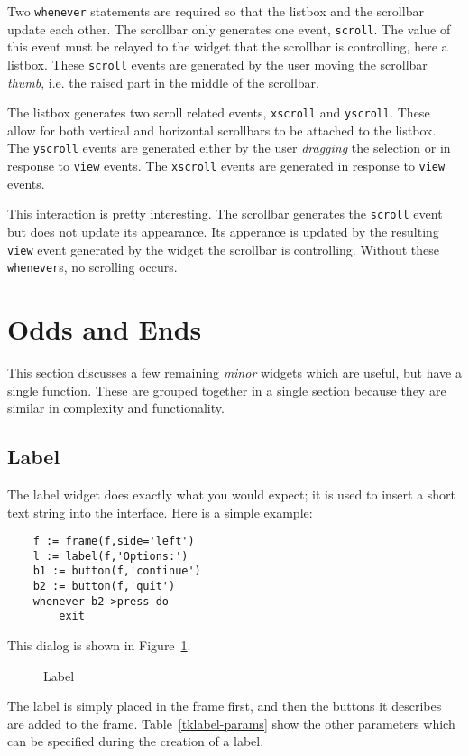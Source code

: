 Two {\tt whenever} statements are required so that the listbox and the scrollbar
update each other. The scrollbar only generates one event, {\tt scroll}. The value
of this event must be relayed to the widget that the scrollbar is controlling, here
a listbox. These {\tt scroll} events are generated by the user moving the scrollbar
{\em thumb}, i.e. the raised part in the middle of the scrollbar.

The listbox generates two scroll related events, {\tt xscroll} and {\tt yscroll}.
These allow for both vertical and horizontal scrollbars to be attached to the listbox.
The {\tt yscroll} events are generated either by the user {\em dragging} the selection
or in response to {\tt view} events. The {\tt xscroll} events are generated in response
to {\tt view} events.

This interaction is pretty interesting. The scrollbar generates the {\tt scroll} event
but does not update its appearance. Its apperance is updated by the resulting {\tt view}
event generated by the widget the scrollbar is controlling. Without these
{\tt whenever}s, no scrolling occurs.
\FloatBarrier

\section{Odds and Ends}
This section discusses a few remaining {\em minor} widgets which 
are useful, but have a single function. These are grouped together in a single
section because they are similar in complexity and functionality.

\subsection{Label}
The label widget does exactly what you would expect; it is used to insert a short
text string into the interface. Here is a simple example:
\begin{verbatim}
    f := frame(f,side='left')
    l := label(f,'Options:')
    b1 := button(f,'continue')
    b2 := button(f,'quit')
    whenever b2->press do
        exit
\end{verbatim}
This dialog is shown in Figure~\ref{tklabel}.
\begin{figure}[thb]
\centerline{}
\caption{ Label }
\label{tklabel}
\end{figure}
The label is simply placed in the frame first, and then the buttons it
describes are added to the frame. Table~\ref{tklabel-params} show the other
parameters which can be specified during the creation of a label.

